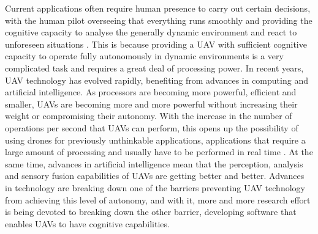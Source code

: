 Current applications often require human presence to carry out certain decisions, with the human pilot overseeing that everything runs smoothly and providing the cognitive capacity to analyse the generally dynamic environment and react to unforeseen situations \cite{sebbane2015smart, MITfullyAutonomous,kopeikin2012flight}. This is because providing a \gls{UAV} with sufficient cognitive capacity to operate fully autonomously in dynamic environments is a very complicated task and requires a great deal of processing power. In recent years, \gls{UAV} technology has evolved rapidly, benefiting from advances in computing and artificial intelligence. As processors are becoming more powerful, efficient and smaller, \glspl{UAV} are becoming more and more powerful without increasing their weight or compromising their autonomy. With the increase in the number of operations per second that \glspl{UAV} can perform, this opens up the possibility of using drones for previously unthinkable applications, applications that require a large amount of processing and usually have to be performed in real time \cite{CivilAplications, shakeri2019design}. At the same time, advances in artificial intelligence mean that the perception, analysis and sensory fusion capabilities of \glspl{UAV} are getting better and better. Advances in technology are breaking down one of the barriers preventing \gls{UAV} technology from achieving this level of autonomy, and with it, more and more research effort is being devoted to breaking down the other barrier, developing software that enables \glspl{UAV} to have cognitive capabilities.

